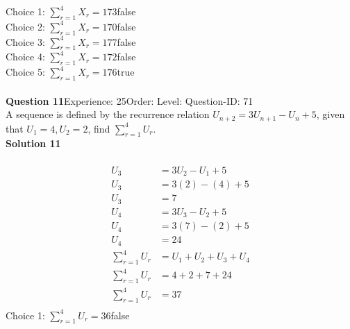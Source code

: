 \documentclass{article}
\begin{document}
Choice 1: \hspace{20pt}$\displaystyle\sum_{r=1}^{4} X_r=173$\hspace{20pt}false\\
Choice 2: \hspace{20pt}$\displaystyle\sum_{r=1}^{4} X_r=170$\hspace{20pt}false\\
Choice 3: \hspace{20pt}$\displaystyle\sum_{r=1}^{4} X_r=177$\hspace{20pt}false\\
Choice 4: \hspace{20pt}$\displaystyle\sum_{r=1}^{4} X_r=172$\hspace{20pt}false\\
Choice 5: \hspace{20pt}$\displaystyle\sum_{r=1}^{4} X_r=176$\hspace{20pt}true\\
\\[4pt]
\noindent\textbf{Question 11}\hspace{20pt}Experience: 25\hspace{20pt}Order: \hspace{20pt}Level: \hspace{20pt}Question-ID: 71\\[2pt]
A sequence is defined by the recurrence relation $U_{n+2}=3U_{n+1}-U_n+5$, given that  $U_1 =4,U_2=2$, find $\displaystyle\sum_{r=1}^{4} U_r$.\\[4pt]
\noindent\textbf{Solution 11}\\[2pt]
\\[-35pt]\begin{align*}
U_3&=3U_2-U_1+5\\[2pt]
U_3&=3(2)-(4)+5\\[2pt]
U_3&=7\\[12pt]
U_4&=3U_3-U_2+5\\[2pt]
U_4&=3(7)-(2)+5\\[2pt]
U_4&=24\\[12pt]
\displaystyle\sum_{r=1}^{4} U_r&=U_1+U_2+U_3+U_4\\[2pt]
\displaystyle\sum_{r=1}^{4} U_r&=4+2+7+24\\[2pt]
\displaystyle\sum_{r=1}^{4} U_r&=37\\[2pt]
\end{align*}
Choice 1: \hspace{20pt}$\displaystyle\sum_{r=1}^{4} U_r=36$\hspace{20pt}false\\
\end{document}
